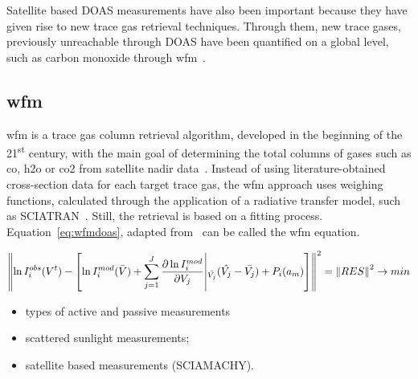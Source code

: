 Satellite based \gls{DOAS} measurements have also been important because
they have given rise to new trace gas retrieval techniques. Through
them, new trace gases, previously unreachable through \gls{DOAS} have
been quantified on a global level, such as carbon monoxide through
\gls{wfm}~\cite{Buchwitz2000, Buchwitz2004}.

\subsection{\acrlong{wfm}}%
\label{sub:wfm_doas}

\gls{wfm} is a trace gas column retrieval algorithm, developed in the
beginning of the 21\textsuperscript{st} century, with the main goal of
determining the total columns of gases such as \gls{co}, \gls{h2o} or
\gls{co2} from satellite nadir data~\cite{Buchwitz2004}. Instead of
using literature-obtained cross-section data for each target trace gas,
the \gls{wfm} approach uses weighing functions, calculated through the
application of a radiative transfer model, such as
SCIATRAN~. Still, the retrieval is based on a
fitting process. Equation~\ref{eq:wfmdoas}, adapted
from~\cite{Buchwitz2000, Buchwitz2004} can be called the \gls{wfm}
equation.

\begin{equation}
    \centering
    \left \lVert \ln I_{i}^{obs}(V^t) - \left[ \ln I_{i}^{mod}(\bar{V}) +
        \sum_{j=1}^{J} \frac{\partial \ln I_{i}^{mod}}{\partial V_{j}}
        \middle \vert_{\bar{V_{j}}} (\hat{V_{j}} - \bar{V_{j}}) +
        P_{i}(a_m)
    \right] \right\rVert^{2} = \left \lVert RES \right \rVert^2
    \rightarrow min
    \label{eq:wfmdoas}
\end{equation}



\begin{itemize}
    \item types of active and passive measurements
    \item scattered sunlight measurements;
    \item satellite based measurements (SCIAMACHY).
\end{itemize}

